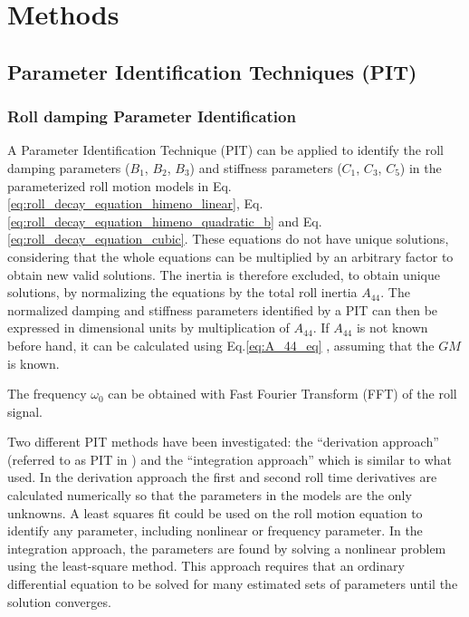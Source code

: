 \chapter{Methods\label{ch:methods}}

\section{Parameter Identification Techniques (PIT)}

\subsection{Roll damping Parameter Identification} \label{sec:PIT_roll}
\noindent A Parameter Identification Technique (PIT) can be applied to identify the roll damping parameters ($B_1$, $B_2$, $B_3$) and stiffness parameters ($C_1$, $C_3$, $C_5$) in the parameterized roll motion models in Eq.\ref{eq:roll_decay_equation_himeno_linear}, Eq.\ref{eq:roll_decay_equation_himeno_quadratic_b} and Eq.\ref{eq:roll_decay_equation_cubic}. These equations do not have unique solutions, considering that the whole equations can be multiplied by an arbitrary factor to obtain new valid solutions. The inertia is therefore excluded, to obtain unique solutions, by normalizing the equations by the total roll inertia $A_{44}$.
The normalized damping and stiffness parameters identified by a PIT can then be expressed in dimensional units by multiplication of $A_{44}$. If $A_{44}$ is not known before hand, it can be calculated using Eq.\ref{eq:A_44_eq} \cite{piehl_ship_2016}, assuming that the $GM$ is known.

\noindent The frequency $\omega_0$ can be obtained with Fast Fourier Transform (FFT) of the roll signal. 

Two different PIT methods have been investigated: the ``derivation approach'' (referred to as PIT in \parencite{imo_1200_2006}) and the ``integration approach'' which is similar to what \parencite{soder_assessment_2019} used. In the derivation approach the first and second roll time derivatives are calculated numerically so that the parameters in the models are the only unknowns. A least squares fit could be used on the roll motion equation to identify any parameter, including nonlinear or frequency parameter. In the integration approach, the parameters are found by solving a nonlinear problem using the least-square method. This approach requires that an ordinary differential equation to be solved for many estimated sets of parameters until the solution converges.